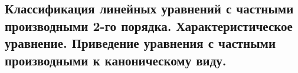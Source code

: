 \subsection{Классификация линейных уравнений с частными производными 2-го порядка. Характеристическое уравнение. Приведение уравнения с частными производными к каноническому виду.}